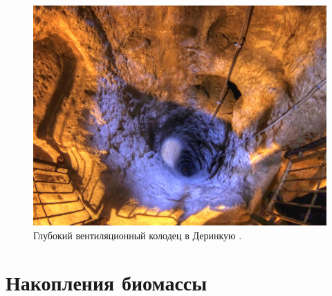 \documentclass[10pt,twocolumn,letterpaper]{article}
\begin{document}
\begin{figure}[t]
\begin{center}
   \includegraphics[width=1\linewidth]{derinkuyu-air.jpg}
\end{center}
   \caption{Глубокий вентиляционный колодец в Деринкую \cite{53}.}
\label{fig:6}
\label{fig:onecol}
\end{figure}


\section{Накопления биомассы}
\end{document}
